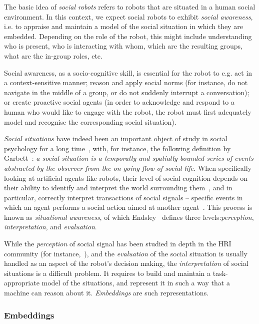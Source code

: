 The basic idea of \emph{social robots} refers to robots that are situated in a
human social environment. In this context, we expect social robots to exhibit
\emph{social awareness}, i.e. to appraise and maintain a model of the social
situation in which they are embedded. Depending on the role of the robot, this
might include understanding who is present, who is interacting with whom, which
are the resulting groups,  what are the in-group roles,  etc.

Social awareness, as a socio-cognitive skill, is essential for the robot to e.g.
act in a context-sensitive manner; reason and apply social norms (for instance,
do not navigate in the middle of a group, or do not suddenly interrupt a
conversation); or create proactive social agents (in order to acknowledge and
respond to a human who would like to engage with the robot, the robot must first
adequately model and recognise the corresponding social situation).

\emph{Social situations} have indeed been an important object of study in social
psychology for a long time~\cite{argyle1981social}, with, for instance, the
following definition by Garbett~\cite{garbett1970analysis}: \emph{a social
situation is a temporally and spatially bounded series of events abstracted by
the observer from the on-going flow of social life}. When specifically looking
at artificial agents like robots, their level of social cognition depends on
their ability to identify and interpret the world surrounding
them~\cite{szczepanowski2017computational}, and in particular, correctly interpret
transactions of social signals -- specific events in which an agent performs a
social action aimed at another agent~\cite{pantic2011social}. This process is known as
\textit{situational awareness}, of which Endsley~\cite{endsley1995theory} defines
three levels:\emph{perception}, \emph{interpretation}, and \emph{evaluation}.

While the \emph{perception} of social signal has been studied in depth in the
HRI community (for instance,~\cite{pantic2011social}), and the \emph{evaluation} of
the social situation is usually handled as an aspect of the robot's decision
making, the \emph{interpretation} of social situations is a difficult problem.
It requires to build and maintain a task-appropriate model of the situations,
and represent it in such a way that a machine can reason about it.
\emph{Embeddings} are such representations.


\subsubsection{Embeddings}

